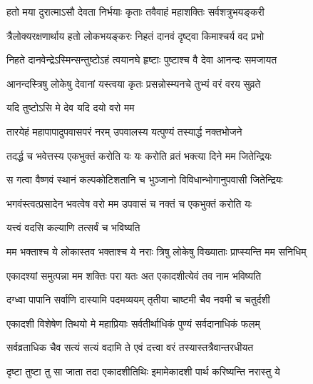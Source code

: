 \twolineshloka
{हतो मया दुरात्माऽसौ देवता निर्भयाः कृताः}
{तवैवाहं महाशक्तिः सर्वशत्रुभयङ्करी} %

\twolineshloka
{त्रैलोक्यरक्षणार्थाय हतो लोकभयङ्करः}
{निहतं दानवं दृष्ट्वा किमाश्चर्य वद प्रभो} %


\twolineshloka
{निहते दानवेन्द्रेऽस्मिन्सन्तुष्टोऽहं त्वयानघे}
{हृष्टाः पुष्टाश्च वै देवा आनन्दः समजायत} %

\twolineshloka
{आनन्दस्त्रिषु लोकेषु देवानां यस्त्वया कृतः}
{प्रसन्नोस्म्यनचे तुभ्यं वरं वरय सुव्रते} %



\onelineshloka
{यदि तुष्टोऽसि मे देव यदि दयो वरो मम} %

\twolineshloka
{तारयेहं महापापादुपवासपरं नरम्}
{उपवालस्य यत्पुण्यं तस्यार्द्ध नक्तभोजने} %

\twolineshloka
{तदर्द्ध च भवेत्तस्य एकभुक्तं करोति यः}
{यः करोति व्रतं भक्त्या दिने मम जितेन्द्रियः} %

\twolineshloka
{स गत्वा वैष्णवं स्थानं कल्पकोटिशतानि च}
{भुञ्जानो विविधान्भोगानुपवासी जितेन्द्रियः} %

\twolineshloka
{भगवंस्त्वत्प्रसादेन भवत्वेष वरो मम}
{उपवासं च नक्तं च एकभुक्तं करोति यः} %



\onelineshloka
{यत्त्वं वदसि कल्याणि तत्सर्वं च भविष्यति} %

\twolineshloka
{मम भक्ताश्च ये लोकास्तव भक्ताश्च ये नराः}
{त्रिषु लोकेषु विख्याताः प्राप्स्यन्ति मम सनिधिम्} %

\twolineshloka
{एकादश्यां समुत्पन्ना मम शक्तिः परा यतः}
{अत एकादशीत्येवं तव नाम भविष्यति} %

\twolineshloka
{दग्ध्वा पापानि सर्वाणि दास्यामि पदमव्ययम्}
{तृतीया चाष्टमी चैव नवमी च चतुर्दशी} %

\twolineshloka
{एकादशी विशेषेण तिथयो मे महाप्रियाः}
{सर्वतीर्थाधिकं पुण्यं सर्वदानाधिकं फलम्} %

\twolineshloka
{सर्वव्रताधिक चैव सत्यं सत्यं वदामि ते}
{एवं दत्त्वा वरं तस्यास्तत्रैवान्तरधीयत} %

\twolineshloka
{दृष्टा तुष्टा तु सा जाता तदा एकादशीतिथिः}
{इमामेकादशी पार्थ करिष्यन्ति नरास्तु ये} %

